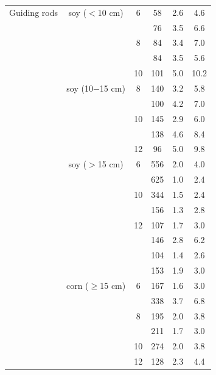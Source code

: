 \documentclass[authoryear]{elsarticle}
\begin{document}
\begin{table}[h]
{\begin{tabular}{lccccc}
      \midrule
      Guiding rods
      & soy ($<$10 cm)
         & 6 & 58  & 2.6 & 4.6\\
      &  &   & 76  & 3.5 & 6.6\\
      &  & 8 & 84  & 3.4 & 7.0\\
      &  &   & 84  & 3.5 & 5.6\\
      &  & 10& 101 & 5.0 & 10.2\\
      \cmidrule(1r){2-6}
      & soy (10$-$15 cm)
         & 8 & 140 & 3.2 & 5.8\\
      &  &   & 100 & 4.2 & 7.0\\
      &  & 10& 145 & 2.9 & 6.0\\
      &  &   & 138 & 4.6 & 8.4\\
      &  & 12& 96  & 5.0 & 9.8\\
      \cmidrule(1r){2-6}
      & soy ($>$15 cm)
         & 6 & 556 & 2.0 & 4.0\\
      &  &   & 625 & 1.0 & 2.4\\
      &  & 10& 344 & 1.5 & 2.4\\
      &  &   & 156 & 1.3 & 2.8\\
      &  & 12& 107 & 1.7 & 3.0\\
      &  &   & 146 & 2.8 & 6.2\\
      &  &   & 104 & 1.4 & 2.6\\
      &  &   & 153 & 1.9 & 3.0\\
      \cmidrule(1r){2-6}
      & corn ($\ge$15 cm)
         & 6 & 167 & 1.6 & 3.0\\
      &  &   & 338 & 3.7 & 6.8\\
      &  & 8 & 195 & 2.0 & 3.8 \\
      &  &   & 211 & 1.7 & 3.0\\
      &  & 10& 274 & 2.0 & 3.8\\
      &  & 12& 128 & 2.3 & 4.4\\
      \bottomrule
    \end{tabular}
  }
  \label{table:all_trials}
\end{table}
\end{document}
